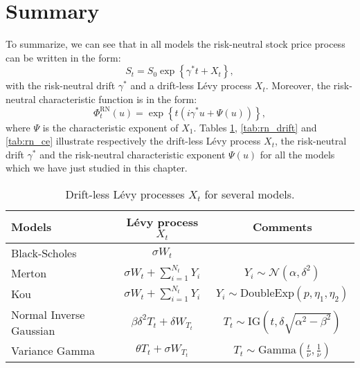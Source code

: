 \section{Summary}
To summarize, we can see that in all models the risk-neutral stock price process can be written in the form:
$$S_t = S_0\exp\left\{\gamma^\ast t + X_t\right\},$$
with the risk-neutral drift $\gamma^\ast$ and a drift-less L\'evy process $X_t$. Moreover, the risk-neutral characteristic function is in the form:
$$\Phi^\text{RN}_t(u) = \exp\left\{t\left(i\gamma^\ast u + \Psi(u)\right)\right\},$$
where $\Psi$ is the characteristic exponent of $X_1$. Tables \ref{tab:LevyPro}, \ref{tab:rn_drift} and \ref{tab:rn_ce} illustrate respectively the drift-less L\'evy process $X_t$, the risk-neutral drift $\gamma^\ast$ and the risk-neutral characteristic exponent $\Psi(u)$ for all the models which we have just studied in this chapter.
\vspace{5cm}
\begin{table}[!ht]
\centering
  \begin{tabular}{l|c|c}
    \toprule
    Models & L\'evy process $X_t$ & Comments\\
    \toprule
   Black-Scholes & $\sigma W_t$ & \\
   \midrule
   Merton & $\sigma W_t +\sum_{i=1}^{N_t}Y_i$ & $Y_i\sim\mathcal{N}(\alpha,\delta^2)$\\
   Kou & $\sigma W_t +\sum_{i=1}^{N_t}Y_i$ & $Y_i\sim\text{DoubleExp}(p,\eta_1,\eta_2)$\\
   \midrule
   Normal Inverse Gaussian & $\beta\delta^2 T_t +\delta W_{T_t}$ & $T_t\sim \text{IG}\left(t,\delta \sqrt{\alpha^2-\beta^2}\right)$ \\
   Variance Gamma & $\theta T_t +\sigma W_{T_t}$ & $T_t\sim \text{Gamma}\left(\frac{t}{\nu},\frac{1}{\nu}\right)$\\ 
    \bottomrule
  \end{tabular}
  \vspace{5pt}
  \caption{\label{tab:LevyPro} Drift-less L\'evy processes $X_t$ for several models.}
\end{table}

